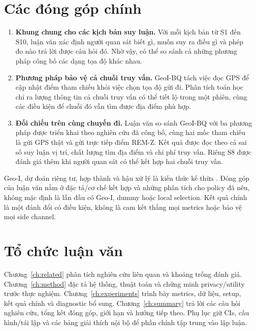 \section{Các đóng góp chính}
\begin{enumerate}
\item \textbf{Khung chung cho các kịch bản suy luận.} Với mỗi kịch bản từ S1 đến S10, luận văn xác định người quan sát biết gì, muốn suy ra điều gì và phép đo nào trả lời được câu hỏi đó. Nhờ vậy, có thể so sánh cả những phương pháp công bố các dạng tọa độ khác nhau.
\item \textbf{Phương pháp bảo vệ cả chuỗi truy vấn.} GeoI-BQ tách việc đọc GPS để cập nhật điểm tham chiếu khỏi việc chọn tọa độ gửi đi. Phân tích toán học chỉ ra lượng thông tin cả chuỗi truy vấn có thể tiết lộ trong một phiên, cùng các điều kiện để chuỗi đó vẫn tìm được địa điểm phù hợp.
\item \textbf{Đối chiếu trên cùng chuyến đi.} Luận văn so sánh GeoI-BQ với ba phương pháp được triển khai theo nghiên cứu đã công bố, cùng hai mốc tham chiếu là gửi GPS thật và gửi trực tiếp điểm REM-Z. Kết quả được đọc theo cả sai số suy luận vị trí, chất lượng tìm địa điểm và chi phí truy vấn. Riêng S8 được đánh giá thêm khi người quan sát có thể kết hợp hai chuỗi truy vấn.

\end{enumerate}

Geo-I, dự đoán riêng tư, hợp thành và hậu xử lý là kiến thức kế thừa \cite{geoi,predictive,dworkroth}.
Đóng góp của luận văn nằm ở đặc tả/cơ chế kết hợp và những phân tích cho policy đã nêu, không mặc định
là lần đầu có Geo-I, dummy hoặc local selection. Kết quả chính là một đánh đổi có điều kiện, không
là cam kết thắng mọi metrics hoặc bảo vệ mọi side channel.

\section{Tổ chức luận văn}
Chương~\ref{ch:related} phân tích nghiên cứu liên quan và khoảng trống đánh giá.
Chương~\ref{ch:method} đặc tả hệ thống, thuật toán và chứng minh privacy/utility trước thực nghiệm.
Chương~\ref{ch:experiments} trình bày metrics, dữ liệu, setup, kết quả chính và diagnostic bổ sung.
Chương~\ref{ch:summary} trả lời các câu hỏi nghiên cứu, tổng kết đóng góp, giới hạn và hướng tiếp theo.
Phụ lục giữ CIs, cấu hình/tái lập và các bảng giải thích nội bộ để phần chính tập trung vào lập luận.
